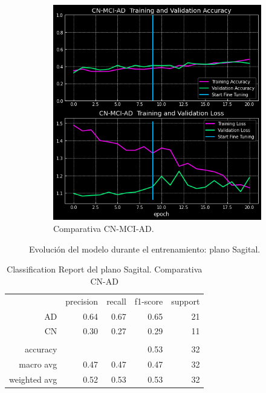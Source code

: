 \begin{figure}[H]
\begin{subfigure}{0.45\textwidth}
        \includegraphics[width=\textwidth]{./imgs/resultados/sagittal/CN_MCI_AD_output_SAGITTAL}
        \caption{Comparativa CN-MCI-AD. }
        \label{fig:sagital-c-mci-ad}
    \end{subfigure}
    \caption{Evolución del modelo durante el entrenamiento: plano Sagital.} \label{fig:sagittal-model}
\end{figure}

\begin{table}[H]
    \centering
    \begin{tabular}{r r r r r}
        & precision & recall & f1-score & support \\
        AD & 0.64 & 0.67 & 0.65 & 21 \\
        CN & 0.30 & 0.27 & 0.29 & 11 \\
        & & & & \\
        accuracy &  &  & 0.53 & 32 \\
        macro avg & 0.47 & 0.47 & 0.47 & 32 \\
        weighted avg & 0.52 & 0.53 & 0.53 & 32 \\
    \end{tabular}
    \caption{Classification Report del plano Sagital. Comparativa CN-AD}
    \label{tab:cr-sagital-cn-ad}
\end{table}

